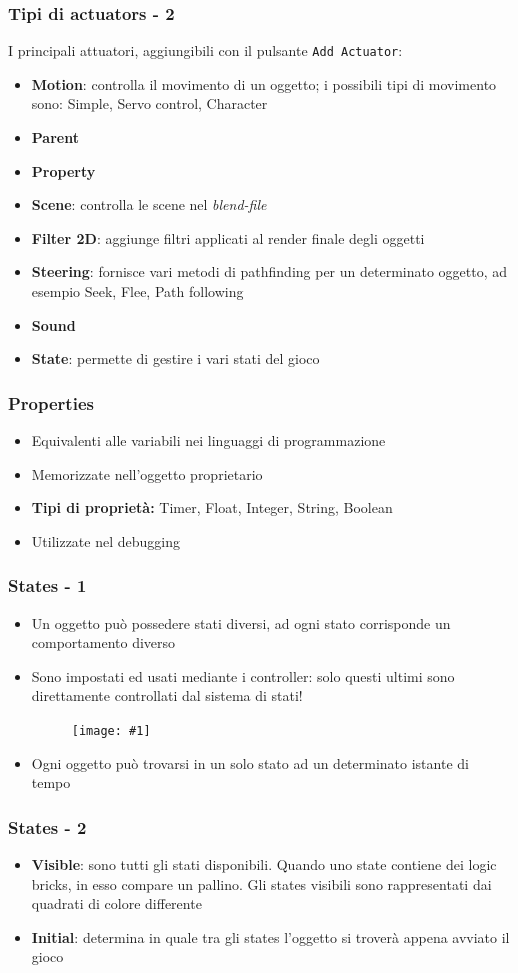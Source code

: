 \documentclass{beamer}
\def\code#1{\texttt{#1}}
\def\image[#1][#2]{
	\begin{figure}[H]
		\centering
		\texttt{[image: \#1]}
\end{figure}}
\begin{document}
				\begin{frame}
			\frametitle{Tipi di actuators - 2}
			I principali attuatori, aggiungibili con il pulsante \code{Add Actuator}:
			\begin{itemize}
				\item \textbf{Motion}: {\footnotesize controlla il movimento di un oggetto; i possibili tipi di movimento sono: Simple, Servo control, Character}
				\item \textbf{Parent}
				\item \textbf{Property}
				\item \textbf{Scene}: {\footnotesize controlla le scene nel \textit{blend-file}}
				\item \textbf{Filter 2D}: {\footnotesize aggiunge filtri applicati al render finale degli oggetti}
				\item \textbf{Steering}: {\footnotesize fornisce vari metodi di pathfinding per un determinato oggetto, ad esempio Seek, Flee, Path following}
				\item \textbf{Sound}
				\item \textbf{State}: {\footnotesize permette di gestire i vari stati del gioco}
			\end{itemize}
		\end{frame}
		
		\begin{frame}
			\frametitle{Properties}
			\begin{itemize}
				\item Equivalenti alle variabili nei linguaggi di programmazione
				\item Memorizzate nell’oggetto proprietario
				\item \textbf{Tipi di proprietà:} Timer, Float, Integer, String, Boolean
				\item Utilizzate nel debugging
			\end{itemize}
		\end{frame}	
		\begin{frame}
			\frametitle{States - 1}
			\begin{itemize}
				\item Un oggetto può possedere stati diversi, ad ogni stato corrisponde un comportamento diverso %
				\item Sono impostati ed usati mediante i controller: solo questi ultimi sono direttamente controllati dal sistema di stati! \image[images/states.png][scale=0.3]
				\item Ogni oggetto può trovarsi in un solo stato ad un determinato istante di tempo
			\end{itemize}
		\end{frame}	
		\begin{frame}
			\frametitle{States - 2}
			\begin{itemize}
				\item\textbf{Visible}: sono tutti gli stati disponibili. Quando uno state contiene dei logic bricks, in esso compare un pallino. Gli states visibili sono rappresentati dai quadrati di colore differente
				\item\textbf{Initial}: determina in quale tra gli states l'oggetto si troverà appena avviato il gioco
			\end{itemize}
		\end{frame}
\end{document}
